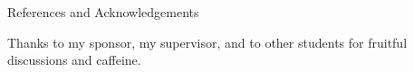 \documentclass[final]{beamer}
\begin{document}
\begin{frame}{}
\begin{textblock}{19.5}
\begin{block}{References and Acknowledgements}
\begin{minipage}{0.9\linewidth}
     {     \printbibliography   %
     } 
\end{minipage}
\vspace{2ex}
{
\tiny Thanks to my sponsor, my supervisor, and to other students for
  fruitful discussions and caffeine.
\par
}
\end{block}

\end{textblock}

\end{frame}
\end{document}

